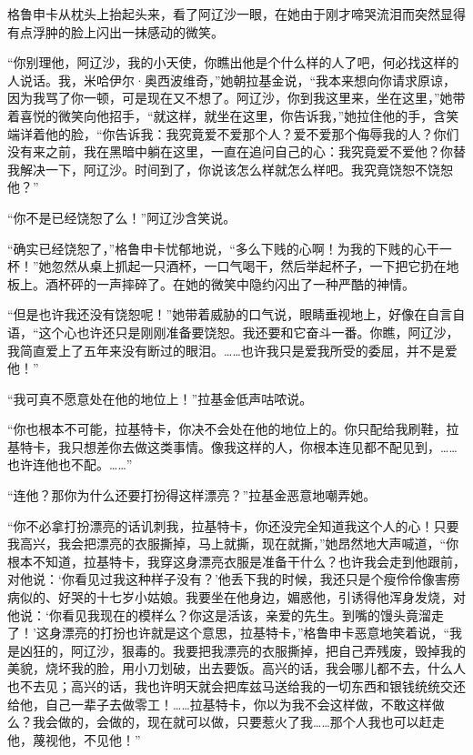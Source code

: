 \par 格鲁申卡从枕头上抬起头来，看了阿辽沙一眼，在她由于刚才啼哭流泪而突然显得有点浮肿的脸上闪出一抹感动的微笑。
\par “你别理他，阿辽沙，我的小天使，你瞧出他是个什么样的人了吧，何必找这样的人说话。我，米哈伊尔·奥西波维奇，”她朝拉基金说，“我本来想向你请求原谅，因为我骂了你一顿，可是现在又不想了。阿辽沙，你到我这里来，坐在这里，”她带着喜悦的微笑向他招手，“就这样，就坐在这里，你告诉我，”她拉住他的手，含笑端详着他的脸，“你告诉我：我究竟爱不爱那个人？爱不爱那个侮辱我的人？你们没有来之前，我在黑暗中躺在这里，一直在追问自己的心：我究竟爱不爱他？你替我解决一下，阿辽沙。时间到了，你说该怎么样就怎么样吧。我究竟饶恕不饶恕他？”
\par “你不是已经饶恕了么！”阿辽沙含笑说。
\par “确实已经饶恕了，”格鲁申卡忧郁地说，“多么下贱的心啊！为我的下贱的心干一杯！”她忽然从桌上抓起一只酒杯，一口气喝干，然后举起杯子，一下把它扔在地板上。酒杯砰的一声摔碎了。在她的微笑中隐约闪出了一种严酷的神情。
\par “但是也许我还没有饶恕呢！”她带着威胁的口气说，眼睛垂视地上，好像在自言自语，“这个心也许还只是刚刚准备要饶恕。我还要和它奋斗一番。你瞧，阿辽沙，我简直爱上了五年来没有断过的眼泪。……也许我只是爱我所受的委屈，并不是爱他！”
\par “我可真不愿意处在他的地位上！”拉基金低声咕哝说。
\par “你也根本不可能，拉基特卡，你决不会处在他的地位上的。你只配给我刷鞋，拉基特卡，我只想差你去做这类事情。像我这样的人，你根本连见都不配见到，……也许连他也不配。……”
\par “连他？那你为什么还要打扮得这样漂亮？”拉基金恶意地嘲弄她。
\par “你不必拿打扮漂亮的话讥刺我，拉基特卡，你还没完全知道我这个人的心！只要我高兴，我会把漂亮的衣服撕掉，马上就撕，现在就撕，”她昂然地大声喊道，“你根本不知道，拉基特卡，我穿这身漂亮衣服是准备干什么？也许我会走到他跟前，对他说：‘你看见过我这种样子没有？’他丢下我的时候，我还只是个瘦伶伶像害痨病似的、好哭的十七岁小姑娘。我要坐在他身边，媚惑他，引诱得他浑身发烧，对他说：‘你看见我现在的模样么？你这是活该，亲爱的先生。到嘴的馒头竟溜走了！’这身漂亮的打扮也许就是这个意思，拉基特卡，”格鲁申卡恶意地笑着说，“我是凶狂的，阿辽沙，狠毒的。我要把我漂亮的衣服撕掉，把自己弄残废，毁掉我的美貌，烧坏我的脸，用小刀划破，出去要饭。高兴的话，我会哪儿都不去，什么人也不去见；高兴的话，我也许明天就会把库兹马送给我的一切东西和银钱统统交还给他，自己一辈子去做零工！……拉基特卡，你以为我不会这样做，不敢这样做么？我会做的，会做的，现在就可以做，只要惹火了我……那个人我也可以赶走他，蔑视他，不见他！”
